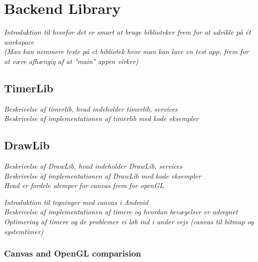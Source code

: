 \section{Backend Library}
\textit{Introduktion til hvorfor det er smart at bruge biblioteker frem for at udvikle på ét workspace\\
(Man kan nemmere teste på et bibliotek hvor man kan lave en test app, frem for at være afhængig af at "main" appen virker)}

\subsection{TimerLib}
\textit{Beskrivelse af timerlib, hvad indeholder timerlib, services\\
Beskrivelse af implementationen af timerlib med kode eksempler}

\subsection{DrawLib}
\textit{Beskrivelse af DrawLib, hvad indeholder DrawLib, services\\
Beskrivelse af implementationen af DrawLib med kode eksempler\\
Hvad er fordele ulemper for canvas frem for openGL}


\textit{Introduktion til tegninger med canvas i Android\\
Beskrivelse af implementationen af timere og hvordan bevægelser er udregnet\\
Optimering af timere og de problemer vi løb ind i under vejs (canvas til bitmap og systemtimer)}

\subsubsection{Canvas and OpenGL comparision}
\label{subsection:compare}